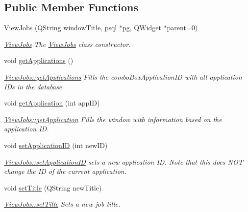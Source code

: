 \subsection*{Public Member Functions}
\begin{DoxyCompactItemize}
\item 
\hyperlink{class_view_jobs_ac78f48cc812a0348a233f33dc78a71cc}{View\+Jobs} (Q\+String window\+Title, \hyperlink{classpsql}{psql} $\ast$pg, Q\+Widget $\ast$parent=0)
\begin{DoxyCompactList}\small\item\em \hyperlink{class_view_jobs}{View\+Jobs} The \hyperlink{class_view_jobs}{View\+Jobs} class constructor. \end{DoxyCompactList}\item 
\mbox{\label{class_view_jobs_af97593f0db01caee0febfe774a823e9c}} 
void \hyperlink{class_view_jobs_af97593f0db01caee0febfe774a823e9c}{get\+Applications} ()
\begin{DoxyCompactList}\small\item\em \hyperlink{class_view_jobs_af97593f0db01caee0febfe774a823e9c}{View\+Jobs\+::get\+Applications} Fills the combo\+Box\+Application\+ID with all application I\+Ds in the database. \end{DoxyCompactList}\item 
void \hyperlink{class_view_jobs_ae9c1c806aa1dd5082b38a1dc9cbec39e}{get\+Application} (int app\+ID)
\begin{DoxyCompactList}\small\item\em \hyperlink{class_view_jobs_ae9c1c806aa1dd5082b38a1dc9cbec39e}{View\+Jobs\+::get\+Application} Fills the window with information based on the application ID. \end{DoxyCompactList}\item 
void \hyperlink{class_view_jobs_acd43a8c32ab9bca7e40ecc99e51da9b8}{set\+Application\+ID} (int new\+ID)
\begin{DoxyCompactList}\small\item\em \hyperlink{class_view_jobs_acd43a8c32ab9bca7e40ecc99e51da9b8}{View\+Jobs\+::set\+Application\+ID} sets a new application ID. Note that this does N\+OT change the ID of the current application. \end{DoxyCompactList}\item 
void \hyperlink{class_view_jobs_abfe1969197cde57ea049c1b7d91cd4f5}{set\+Title} (Q\+String new\+Title)
\begin{DoxyCompactList}\small\item\em \hyperlink{class_view_jobs_abfe1969197cde57ea049c1b7d91cd4f5}{View\+Jobs\+::set\+Title} Sets a new job title. \end{DoxyCompactList}\item 

\end{DoxyCompactItemize}
